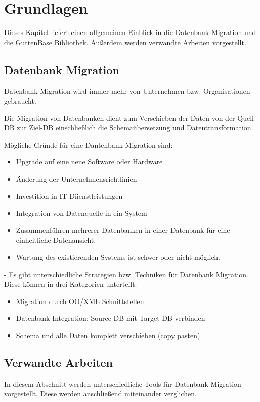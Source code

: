 \chapter{Grundlagen}
Dieses Kapitel liefert einen allgemeinen Einblick in die Datenbank Migration und die GuttenBase Bibliothek. Außerdem werden verwandte Arbeiten vorgestellt. 
\section{Datenbank Migration}




Datenbank Migration wird immer mehr von Unternehmen bzw. Organisationen gebraucht. 

Die Migration von Datenbanken dient zum Verschieben der Daten von der Quell-DB zur Ziel-DB einschließlich die Schemaübersetzung und Datentransformation.


Mögliche Gründe für eine Dantenbank Migration sind:
\begin{itemize}
	\item Upgrade auf eine neue Software oder Hardware
	\item Änderung der Unternehmensrichtlinien
	\item Investition in IT-Diienstleistungen
	\item Integration von Datenquelle in ein System
	\item Zusammenführen mehrerer Datenbanken in einer Datenbank für eine einheitliche Datenansicht.
	\item Wartung des existierenden Systems ist schwer oder nicht möglich.
\end{itemize}

- Es gibt unterschiedliche Strategien bzw. Techniken für Datenbank Migration. Diese können in drei Kategorien unterteilt:

\begin{itemize}
	\item Migration durch OO/XML Schnittstellen
	\item Datenbank Integration: Source DB mit Target DB verbinden
	\item Schema und alle Daten komplett verschieben (copy pasten).
\end{itemize}


\section{Verwandte Arbeiten}
In diesem Abschnitt werden unterschiedliche Tools für Datenbank Migration vorgestellt. Diese werden anschließend miteinander verglichen.
